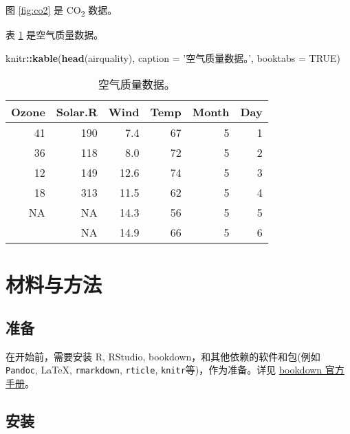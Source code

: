 \documentclass[doublesided]{Style/ucasthesis}%
\newenvironment{Shaded}{\begin{snugshade}}{\end{snugshade}}
\newcommand{\KeywordTok}[1]{\textcolor[rgb]{0.13,0.29,0.53}{\textbf{{#1}}}}
\newcommand{\DataTypeTok}[1]{\textcolor[rgb]{0.13,0.29,0.53}{{#1}}}
\newcommand{\StringTok}[1]{\textcolor[rgb]{0.31,0.60,0.02}{{#1}}}
\newcommand{\OtherTok}[1]{\textcolor[rgb]{0.56,0.35,0.01}{{#1}}}
\newcommand{\OperatorTok}[1]{\textcolor[rgb]{0.81,0.36,0.00}{\textbf{{#1}}}}
\newcommand{\NormalTok}[1]{{#1}}
\begin{document}
图 \ref{fig:co2} 是 CO\textsubscript{2} 数据。

表 \ref{tab:tabair} 是空气质量数据。

\begin{Shaded}
\begin{Highlighting}[]
\NormalTok{knitr}\OperatorTok{::}\KeywordTok{kable}\NormalTok{(}\KeywordTok{head}\NormalTok{(airquality), }\DataTypeTok{caption =} \StringTok{'空气质量数据。'}\NormalTok{,}
                   \DataTypeTok{booktabs =} \OtherTok{TRUE}\NormalTok{)}
\end{Highlighting}
\end{Shaded}

\begin{table}[t]

\caption{\label{tab:tabair}空气质量数据。}
\centering
\begin{tabular}{rrrrrr}
\toprule
Ozone & Solar.R & Wind & Temp & Month & Day\\
\midrule
41 & 190 & 7.4 & 67 & 5 & 1\\
36 & 118 & 8.0 & 72 & 5 & 2\\
12 & 149 & 12.6 & 74 & 5 & 3\\
18 & 313 & 11.5 & 62 & 5 & 4\\
NA & NA & 14.3 & 56 & 5 & 5\\
\addlinespace
28 & NA & 14.9 & 66 & 5 & 6\\
\bottomrule
\end{tabular}
\end{table}

\hypertarget{section-1}{%
\chapter{材料与方法}\label{section-1}}

\hypertarget{section-2}{%
\section{准备}\label{section-2}}

在开始前，需要安装 R, RStudio, bookdown，和其他依赖的软件和包(例如 \texttt{Pandoc}, LaTeX, \texttt{rmarkdown}, \texttt{rticle}, \texttt{knitr}等)，作为准备。详见 \href{https://bookdown.org/yihui/bookdown/}{bookdown 官方手册}。

\hypertarget{section-3}{%
\section{安装}\label{section-3}}
\end{document}

